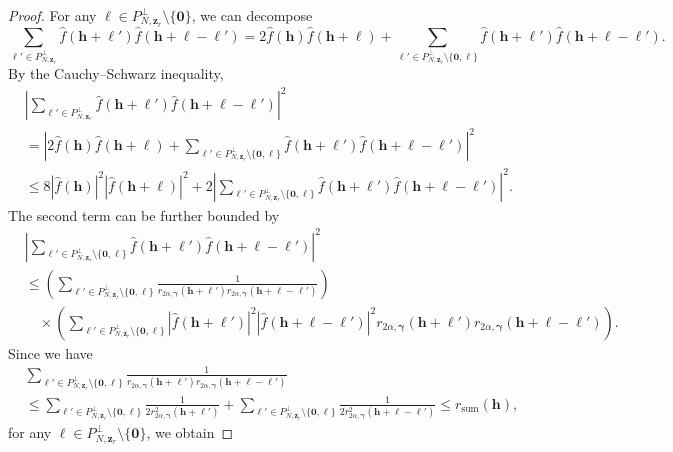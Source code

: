 \documentclass[10pt,a4paper]{amsart}
\newcommand{\abs}[1]{\left\vert#1\right\vert}
\newcommand{\bsgamma}{\boldsymbol{\gamma}}
\newcommand{\bsh}{\boldsymbol{h}}
\newcommand{\bsl}{\boldsymbol{\ell}}
\newcommand{\bszero}{\boldsymbol{0}}
\begin{document}
\begin{proof}
    For any $\bsl \in P_{N,\boldsymbol{z}_r}^\perp\setminus \{\bszero\}$, we can decompose
    \[ 
    \sum_{\bsl'\in P_{N,\boldsymbol{z}_r}^\perp}\widehat{f}(\bsh+\bsl')\widehat{f}(\bsh+\bsl-\bsl')=2\widehat{f}(\bsh)\widehat{f}(\bsh+\bsl)+\sum_{\bsl'\in P_{N,\boldsymbol{z}_r}^\perp\setminus\{\bszero,\bsl\} }\widehat{f}(\bsh+\bsl')\widehat{f}(\bsh+\bsl-\bsl').
    \]
    By the Cauchy--Schwarz inequality,
    \begin{align}\label{eqn:fhfhl}
       & \abs{\sum_{\bsl'\in P_{N,\boldsymbol{z}_r}^\perp}\widehat{f}(\bsh+\bsl')\widehat{f}(\bsh+\bsl-\bsl')}^2 \nonumber \\
       & = \abs{2\widehat{f}(\bsh)\widehat{f}(\bsh+\bsl)+\sum_{\bsl'\in P_{N,\boldsymbol{z}_r}^\perp\setminus\{\bszero,\bsl\} }\widehat{f}(\bsh+\bsl')\widehat{f}(\bsh+\bsl-\bsl')}^2\nonumber  \\
       & \leq 8|\widehat{f}(\bsh)|^2|\widehat{f}(\bsh+\bsl)|^2+2\abs{\sum_{\bsl'\in P_{N,\boldsymbol{z}_r}^\perp\setminus\{\bszero,\bsl\} }\widehat{f}(\bsh+\bsl')\widehat{f}(\bsh+\bsl-\bsl')}^2.
    \end{align}
    The second term can be further bounded by
    \begin{align*}
        & \abs{\sum_{\bsl'\in P_{N,\boldsymbol{z}_r}^\perp\setminus\{\bszero,\bsl\} }\widehat{f}(\bsh+\bsl')\widehat{f}(\bsh+\bsl-\bsl')}^2 \\
        & \leq \left(\sum_{\bsl'\in P_{N,\boldsymbol{z}_r}^\perp\setminus\{\bszero,\bsl\} }\frac{1}{r_{2\alpha, \bsgamma}(\bsh+\bsl')r_{2\alpha, \bsgamma}(\bsh+\bsl-\bsl')}\right) \\
        & \quad \times  \left(\sum_{\bsl'\in P_{N,\boldsymbol{z}_r}^\perp\setminus\{\bszero,\bsl\} }|\widehat{f}(\bsh+\bsl')|^2|\widehat{f}(\bsh+\bsl-\bsl')|^2r_{2\alpha, \bsgamma}(\bsh+\bsl')r_{2\alpha, \bsgamma}(\bsh+\bsl-\bsl')\right).
    \end{align*}
    Since we have 
    \begin{align*}
        &\sum_{\bsl'\in P_{N,\boldsymbol{z}_r}^\perp\setminus\{\bszero,\bsl\} }\frac{1}{r_{2\alpha, \bsgamma}(\bsh+\bsl')r_{2\alpha, \bsgamma}(\bsh+\bsl-\bsl')} \\
    & \leq \sum_{\bsl'\in P_{N,\boldsymbol{z}_r}^\perp\setminus\{\bszero,\bsl\} }\frac{1}{2r^2_{2\alpha, \bsgamma}(\bsh+\bsl')}+\sum_{\bsl'\in P_{N,\boldsymbol{z}_r}^\perp\setminus\{\bszero,\bsl\} }\frac{1}{2r^2_{2\alpha, \bsgamma}(\bsh+\bsl-\bsl')} \leq r_{\mathrm{sum}}(\bsh),
    \end{align*}
    for any $\bsl \in P_{N,\boldsymbol{z}_r}^\perp\setminus \{\bszero\}$, we obtain

\end{proof}
\end{document}
